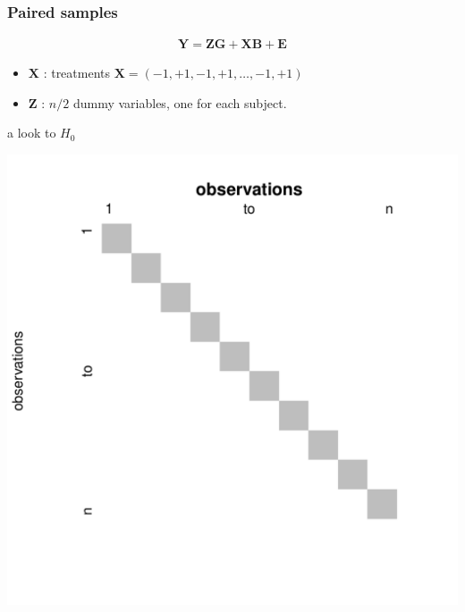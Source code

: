 \documentclass[xcolor={pdftex,dvipsnames,table}]{beamer}
\newcommand{\bb}[1]{\begin{block}{#1}}
\newcommand{\eb}{\end{block}}
\newcommand{\bi}{\begin {itemize}}
\newcommand{\ei}{\end{itemize}}
\begin{document}
\begin{frame}[fragile]
\frametitle{Paired samples}

\begin{eqnarray*}
\mathbf{Y} = \mathbf{Z}\mathbf{G} +  \mathbf{X}\mathbf{B} + \mathbf{E}
\end{eqnarray*}

\bi
\item $\mathbf{X}$ : treatments $\mathbf{X}=(-1,+1,-1,+1,\ldots,-1,+1)$
\item  $\mathbf{Z}$ : $n/2$ dummy variables, one for each subject.
\ei 
\pause
\bb{a look to $H_0$}
\begin{center}
\includegraphics[scale=.25]{figures_perm_covariates/Ppair2sample}
\end{center}
\eb
\end{frame}
\end{document}
